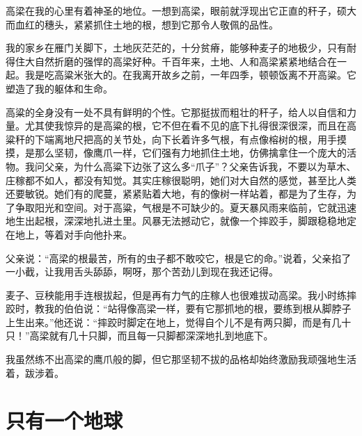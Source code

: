 \documentclass[12pt,UTF-8,openany]{ctexbook}
\begin{document}
\begin{Large}
    
    高梁在我的心里有着神圣的地位。一想到高梁，眼前就浮现出它正直的秆子，硕大而血红的穗头，紧紧抓住土地的根，想到它那令人敬佩的品性。
    
    我的家乡在雁门关脚下，土地灰茫茫的，十分贫瘠，能够种麦子的地极少，只有耐得住大自然折磨的强悍的高梁好种。千百年来，土地、人和高梁紧紧地结合在一起。我是吃高粱米张大的。在我离开故乡之前，一年四季，顿顿饭离不开高粱。它塑造了我的躯体和生命。
    
    高粱的全身没有一处不具有鲜明的个性。它那挺拔而粗壮的秆子，给人以自信和力量。尤其使我惊异的是高粱的根，它不但在看不见的底下扎得很深很深，而且在高粱秆的下端离地尺把高的关节处，向下长着许多气根，有点像榕树的根，用手摸摸，是那么坚韧，像鹰爪一样，它们强有力地抓住土地，仿佛擒拿住一个庞大的活物。我问父亲，为什么高粱下边张了这么多“爪子”？父亲告诉我，不要以为草木、庄稼都不如人，都没有知觉。其实庄稼很聪明，她们对大自然的感觉，甚至比人类还要敏锐。她们有的爬蔓，紧紧贴着大地，有的像树一样站着，都是为了生存，为了争取阳光和空间。对于高粱，气根是不可缺少的。夏天暴风雨来临前，它就迅速地生出起根，深深地扎进土里。风暴无法撼动它，就像一个摔跤手，脚跟稳稳地定在地上，等着对手向他扑来。
    
    父亲说：“高梁的根最苦，所有的虫子都不敢咬它，根是它的命。”说着，父亲掐了一小截，让我用舌头舔舔，啊呀，那个苦劲儿到现在我还记得。
    
    麦子、豆秧能用手连根拔起，但是再有力气的庄稼人也很难拔动高梁。我小时练摔跤时，教我的伯伯说：“站得像高梁一样，要有它那抓地的根，要练到根从脚脖子上生出来。”他还说：“摔跤时脚定在地上，觉得自个儿不是有两只脚，而是有几十只！”高梁就有几十只脚，而且每一只脚都深深地扎到地底下。
    
    我虽然练不出高梁的鹰爪般的脚，但它那坚韧不拔的品格却始终激励我顽强地生活着，跋涉着。
    
\end{Large}

\chapter{只有一个地球}
\end{document}
